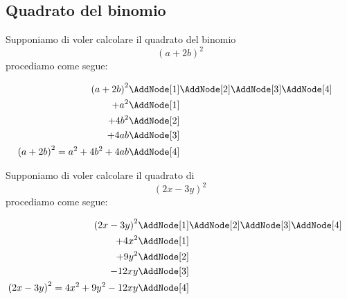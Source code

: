 \subsection{Quadrato del binomio}
\begin{esempiot}{}{}
Supponiamo di voler calcolare il quadrato del binomio \[\left(a+2b\right)^2 \]
procediamo come segue:
\begin{NodesList}
	\begin{align*}
		\left(a+2b\right)^2&\AddNode[1]\AddNode[2]\AddNode[3]\AddNode[4]\\
		+a^2&\AddNode[1]&\\ 
		+4b^2&\AddNode[2]&\\
		+4ab&\AddNode[3]\\
		\left(a+2b\right)^2=a^2+4b^2+4ab&\AddNode[4]
	\end{align*}
\end{NodesList}
\end{esempiot}
\begin{esempiot}{}{}
Supponiamo di voler calcolare il quadrato di \[ \left(2x-3y\right)^2\]
procediamo come segue:
\begin{NodesList}
	\begin{align*}
		\left(2x-3y\right)^2&\AddNode[1]\AddNode[2]\AddNode[3]\AddNode[4]\\
		+4x^2&\AddNode[1]&\\ 
		+9y^2&\AddNode[2]&\\
		-12xy&\AddNode[3]\\
		\left(2x-3y\right)^2=4x^2+9y^2-12xy&\AddNode[4]
	\end{align*}
\end{NodesList}
\end{esempiot}
